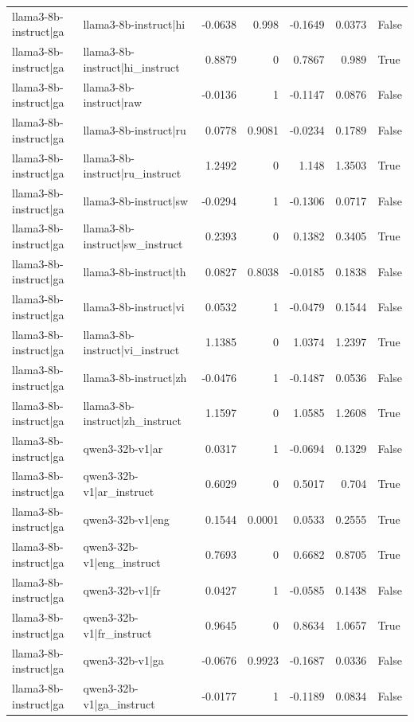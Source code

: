 \begin{table}
\begin{tabular}{l l r r r r l}
llama3-8b-instruct|ga & llama3-8b-instruct|hi & -0.0638 & 0.998 & -0.1649 & 0.0373 & False \\
llama3-8b-instruct|ga & llama3-8b-instruct|hi_instruct & 0.8879 & 0 & 0.7867 & 0.989 & True \\
llama3-8b-instruct|ga & llama3-8b-instruct|raw & -0.0136 & 1 & -0.1147 & 0.0876 & False \\
llama3-8b-instruct|ga & llama3-8b-instruct|ru & 0.0778 & 0.9081 & -0.0234 & 0.1789 & False \\
llama3-8b-instruct|ga & llama3-8b-instruct|ru_instruct & 1.2492 & 0 & 1.148 & 1.3503 & True \\
llama3-8b-instruct|ga & llama3-8b-instruct|sw & -0.0294 & 1 & -0.1306 & 0.0717 & False \\
llama3-8b-instruct|ga & llama3-8b-instruct|sw_instruct & 0.2393 & 0 & 0.1382 & 0.3405 & True \\
llama3-8b-instruct|ga & llama3-8b-instruct|th & 0.0827 & 0.8038 & -0.0185 & 0.1838 & False \\
llama3-8b-instruct|ga & llama3-8b-instruct|vi & 0.0532 & 1 & -0.0479 & 0.1544 & False \\
llama3-8b-instruct|ga & llama3-8b-instruct|vi_instruct & 1.1385 & 0 & 1.0374 & 1.2397 & True \\
llama3-8b-instruct|ga & llama3-8b-instruct|zh & -0.0476 & 1 & -0.1487 & 0.0536 & False \\
llama3-8b-instruct|ga & llama3-8b-instruct|zh_instruct & 1.1597 & 0 & 1.0585 & 1.2608 & True \\
llama3-8b-instruct|ga & qwen3-32b-v1|ar & 0.0317 & 1 & -0.0694 & 0.1329 & False \\
llama3-8b-instruct|ga & qwen3-32b-v1|ar_instruct & 0.6029 & 0 & 0.5017 & 0.704 & True \\
llama3-8b-instruct|ga & qwen3-32b-v1|eng & 0.1544 & 0.0001 & 0.0533 & 0.2555 & True \\
llama3-8b-instruct|ga & qwen3-32b-v1|eng_instruct & 0.7693 & 0 & 0.6682 & 0.8705 & True \\
llama3-8b-instruct|ga & qwen3-32b-v1|fr & 0.0427 & 1 & -0.0585 & 0.1438 & False \\
llama3-8b-instruct|ga & qwen3-32b-v1|fr_instruct & 0.9645 & 0 & 0.8634 & 1.0657 & True \\
llama3-8b-instruct|ga & qwen3-32b-v1|ga & -0.0676 & 0.9923 & -0.1687 & 0.0336 & False \\
llama3-8b-instruct|ga & qwen3-32b-v1|ga_instruct & -0.0177 & 1 & -0.1189 & 0.0834 & False \\

\end{tabular}
\end{table}
